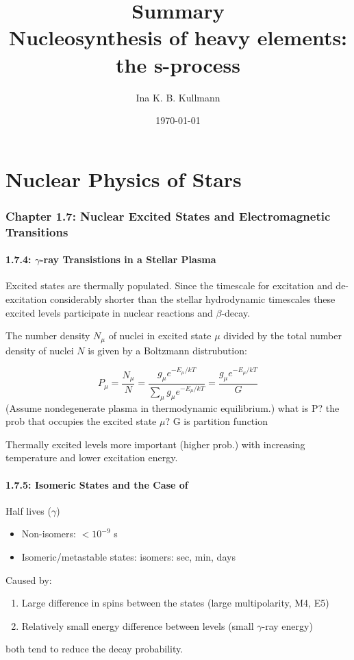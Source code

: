 \documentclass[a4paper,12pt]{article}
\title{\Huge{\textbf{Summary}} \\ \Large{Nucleosynthesis of heavy elements: the s-process}}
\author{Ina K. B. Kullmann}
\date{\today}
\begin{document}
\maketitle
\part{Nuclear Physics of Stars}
\section*{Chapter 1.7: Nuclear Excited States and Electromagnetic Transitions}
\subsection*{1.7.4: $\gamma$-ray Transistions in a Stellar Plasma}
Excited states are thermally populated. Since the timescale for excitation and de-excitation considerably shorter than the stellar hydrodynamic timescales these excited levels participate in nuclear reactions and $\beta$-decay. 

The number density $N_{\mu}$ of nuclei in excited state $\mu$ divided by the total number density of nuclei $N$ is given by a Boltzmann distrubution:

\begin{equation}
P_\mu = \frac{N_\mu}{N} = \frac{g_\mu e^{-E_\mu/kT}}{\sum_\mu g_\mu e^{-E_\mu/kT}} = \frac{g_\mu e^{-E_\mu/kT}}{G}
\end{equation}
(Assume nondegenerate plasma in thermodynamic equilibrium.)
what is P? the prob that occupies the excited state $\mu$? G is partition function

Thermally excited levels more important (higher prob.) with increasing temperature and lower excitation energy. 

\subsection*{1.7.5: Isomeric States and the Case of }
Half lives ($\gamma$) 
\begin{itemize}
\item Non-isomers: $< 10^{-9}$ s
\item Isomeric/metastable states: isomers: sec, min, days
\end{itemize}

Caused by:
\begin{enumerate}
\item Large difference in spins between the states (large multipolarity, M4, E5)
\item Relatively small energy difference between levels (small $\gamma$-ray energy)
\end{enumerate}
both tend to reduce the decay probability.
\end{document}
